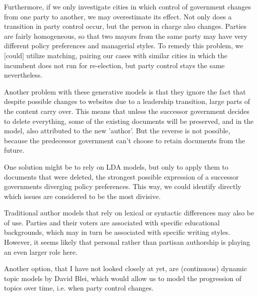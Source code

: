 \documentclass[11pt]{article}
\begin{document}
Furthermore, if we only investigate cities in which control of government changes from one party to another, we may overestimate its effect. Not only does a transition in party control occur, but the person in charge also changes. Parties are fairly homogeneous, so that two mayors from the same party may have very different policy preferences and managerial styles. To remedy this problem, we [could] utilize matching, pairing our cases with similar cities in which the incumbent does not run for re-election, but party control stays the same nevertheless.

Another problem with these generative models is that they ignore the fact that despite possible changes to websites due to a leadership transition, large parts of the content carry over. This means that unless the successor government decides to delete everything, some of the existing documents will be preserved, and in the model, also attributed to the new 'author'. But the reverse is not possible, because the predecessor government can't choose to retain documents from the future.

One solution might be to rely on LDA models, but only to apply them to documents that were deleted, the strongest possible expression of a successor governments diverging policy preferences. This way, we could identify directly which issues are considered to be the most divisive.

Traditional author models that rely on lexical or syntactic differences may also be of use. Parties and their voters are associated with specific educational backgrounds, which may in turn be associated with specific writing styles. However, it seems likely that personal rather than partisan authorship is playing an even larger role here.

Another option, that I have not looked closely at yet, are (continuous) dynamic topic models by David Blei, which would allow us to model the progression of topics over time, i.e. when party control changes.
\end{document}
